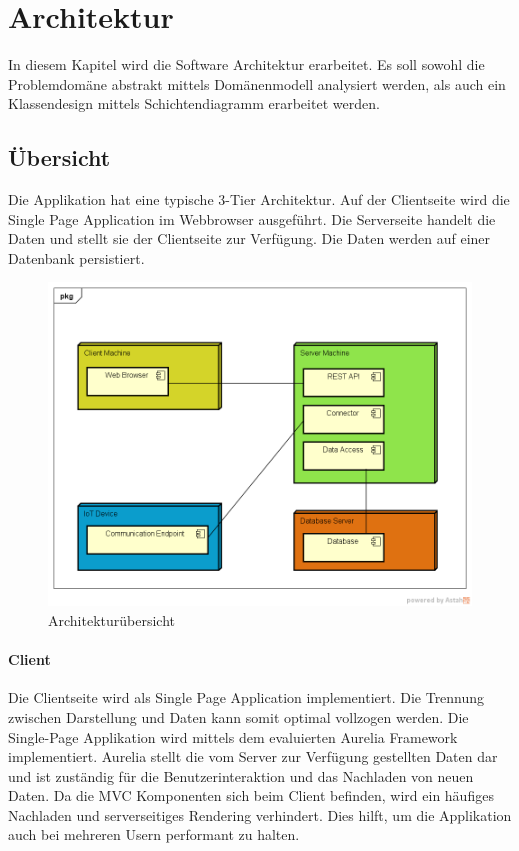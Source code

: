  \chapter{Architektur}
In diesem Kapitel wird die Software Architektur erarbeitet.  
Es soll sowohl die Problemdomäne abstrakt mittels Domänenmodell analysiert werden, als auch ein Klassendesign mittels Schichtendiagramm erarbeitet werden.

\section{Übersicht}
Die Applikation hat eine typische 3-Tier Architektur. Auf der Clientseite wird die Single Page Application im Webbrowser ausgeführt. Die Serverseite handelt die Daten und stellt sie der Clientseite zur Verfügung. Die Daten werden auf einer Datenbank persistiert.
\begin{figure}[H]
\center
\includegraphics[scale=0.6]{images/architekturuebersicht}\caption{Architekturübersicht}
\end{figure}
\subsubsection{Client}
Die Clientseite wird als Single Page Application implementiert. Die Trennung zwischen Darstellung und Daten kann somit optimal vollzogen werden. Die Single-Page Applikation wird mittels dem evaluierten Aurelia Framework implementiert. Aurelia stellt die vom Server zur Verfügung gestellten Daten dar und ist zuständig für die Benutzerinteraktion und das Nachladen von neuen Daten. Da die MVC Komponenten sich beim Client befinden, wird ein häufiges Nachladen und serverseitiges Rendering verhindert. Dies hilft, um die Applikation auch bei mehreren Usern performant zu halten.
